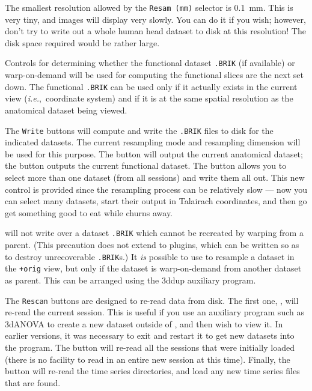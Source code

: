 The smallest resolution allowed by the {\tt Resam~(mm)}
selector is 0.1~mm.  This is very tiny, and images will display
very slowly.  You can do it if you wish; however, don't try to
write out a whole human head dataset to disk at this resolution!
The disk space required would be rather large.

Controls for determining whether the functional dataset {\tt .BRIK}
(if available) or warp-on-demand will be used for computing the
functional slices are the next set down.  The
functional {\tt .BRIK} can be used only if it actually exists
in the current view ({\it i.e.},~coordinate system)
and if it is at the same spatial resolution as the anatomical
dataset being viewed.

The {\tt Write} buttons
will compute and write the {\tt .BRIK} files
to disk for the indicated datasets.  The current resampling mode and
resampling dimension will be used for this purpose.
The  button will output the current anatomical
dataset; the  button outputs the current functional dataset.
The  button allows you to select more than one dataset
(from all sessions) and write them all out.  This new control is provided
since the resampling process can be relatively slow --- now you can
select many datasets, start their output in Talairach coordinates, and
then go get something good to eat while \afnit churns away.

\afnit will\seeme{}
not write over a dataset {\tt .BRIK} which cannot be
recreated by warping from a parent.
(This precaution does not extend to plugins, which can be
written so as to destroy unrecoverable {\tt .BRIK}s.)
It {\it is\/} possible to
use \afnit to resample a dataset in the {\tt +orig} view, but
only if the dataset is warp-on-demand from another dataset as parent.
This can be arranged using the {\sf 3ddup} auxiliary program.

The {\tt Rescan} buttons are designed to re-read data from disk.
The first one, , will re-read the current session.
This is useful if you use an auxiliary program such as {\sf 3dANOVA}
to create a new dataset outside of \afni, and then wish to view it.
In earlier versions, it was necessary to exit \afnit and restart
it to get new datasets into the program.
The  button will re-read all the sessions that were
initially loaded (there is no facility to read in an entire new
session at this time).  Finally, the  button
will re-read the time series directories, and load any new time
series files that are found.


